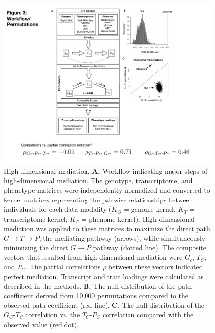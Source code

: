 \documentclass[
]{article}
\providecommand{\DIFaddtex}[1]{{\protect\color{blue}\uwave{#1}}} %
\providecommand{\DIFdeltex}[1]{{\protect\color{red}\sout{#1}}}                      %
\providecommand{\DIFaddFL}[1]{\DIFadd{#1}} %
\providecommand{\DIFdelFL}[1]{\DIFdel{#1}} %
\providecommand{\DIFaddbeginFL}{} %
\providecommand{\DIFaddendFL}{} %
\providecommand{\DIFdelbeginFL}{} %
\providecommand{\DIFdelendFL}{} %
\providecommand{\DIFadd}[1]{\texorpdfstring{\DIFaddtex{#1}}{#1}} %
\providecommand{\DIFdel}[1]{\texorpdfstring{\DIFdeltex{#1}}{}} %
\newcommand{\DIFscaledelfig}{0.5}
\newlength{\DIFdelgraphicswidth} %
\newlength{\DIFdelgraphicsheight} %
\newcommand{\DIFaddincludegraphics}[2][]{{\color{blue}\fbox{\DIFOincludegraphics[#1]{#2}}}} %
\newcommand{\DIFdelincludegraphics}[2][]{%
\sbox{\DIFdelgraphicsbox}{\DIFOincludegraphics[#1]{#2}}%
\settoboxwidth{\DIFdelgraphicswidth}{\DIFdelgraphicsbox} %
\settoboxtotalheight{\DIFdelgraphicsheight}{\DIFdelgraphicsbox} %
\scalebox{\DIFscaledelfig}{%
\parbox[b]{\DIFdelgraphicswidth}{\usebox{\DIFdelgraphicsbox}\\[-\baselineskip] \rule{\DIFdelgraphicswidth}{0em}}\llap{\resizebox{\DIFdelgraphicswidth}{\DIFdelgraphicsheight}{%
\setlength{\unitlength}{\DIFdelgraphicswidth}%
\begin{picture}(1,1)%
\thicklines\linethickness{2pt} %
{\color[rgb]{1,0,0}\put(0,0){\framebox(1,1){}}}%
{\color[rgb]{1,0,0}\put(0,0){\line( 1,1){1}}}%
{\color[rgb]{1,0,0}\put(0,1){\line(1,-1){1}}}%
\end{picture}%
}\hspace*{3pt}}} %
} %
\DeclareRobustCommand{\DIFaddbeginFL}{\DIFOaddbeginFL \let\includegraphics\DIFaddincludegraphics} %
\DeclareRobustCommand{\DIFaddendFL}{\DIFOaddendFL \let\includegraphics\DIFOincludegraphics} %
\DeclareRobustCommand{\DIFdelbeginFL}{\DIFOdelbeginFL \let\includegraphics\DIFdelincludegraphics} %
\DeclareRobustCommand{\DIFdelendFL}{\DIFOaddendFL \let\includegraphics\DIFOincludegraphics} %
\begin{document}
\begin{figure}[ht!]
\includegraphics[width=5in]{Figures/Fig3_workflow.pdf} 
\caption{High-dimensional mediation. \textbf{A.} Workflow indicating 
major steps of high-dimensional mediation. The genotype, transcriptome, 
and phenotype matrices were independently normalized and converted to 
kernel matrices representing the pairwise relationships between 
individuals for each data modality (\DIFdelbeginFL \DIFdelFL{$K_G$ }\DIFdelendFL \DIFaddbeginFL \DIFaddFL{$G_K$ }\DIFaddendFL = genome kernel, \DIFdelbeginFL \DIFdelFL{$K_T$ }\DIFdelendFL \DIFaddbeginFL \DIFaddFL{$T_K$ }\DIFaddendFL = 
transcriptome kernel; \DIFdelbeginFL \DIFdelFL{$K_P$ }\DIFdelendFL \DIFaddbeginFL \DIFaddFL{$P_K$ }\DIFaddendFL = phenome kernel). 
High-dimensional mediation was applied to these matrices to maximize the 
direct path $G \rightarrow T \rightarrow P$, the mediating pathway (arrows), 
while simultaneously minimizing the direct $G \rightarrow P$ pathway (dotted 
line). The composite vectors that resulted from high-dimensional mediation were 
\DIFdelbeginFL \DIFdelFL{$G_c$}\DIFdelendFL \DIFaddbeginFL \DIFaddFL{$G_C$}\DIFaddendFL , $T_C$, and $P_C$. The partial correlations $\rho$ between these vectors 
indicated perfect mediation. Transcript and trait loadings were calculated 
as described in the \DIFdelbeginFL \DIFdelFL{methods}\DIFdelendFL \DIFaddbeginFL \DIFaddFL{Methods}\DIFaddendFL . \textbf{B.} The null distribution of the path 
coefficient derived from 10,000 permutations compared to the observed path 
coefficient (red line). \textbf{C.} The null distribution of the $G_C$-$T_C$ 
correlation vs. the $T_C$-$P_C$ correlation compared with the observed value 
(red dot).
}
\label{fig:workflow}
\end{figure}
\end{document}
